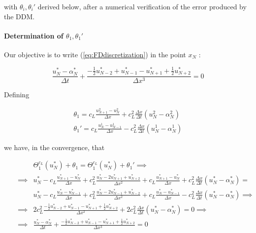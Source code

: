 \noindent with $\theta_i, \theta_i'$ derived below, after a numerical verification of the error produced by the DDM.


\paragraph{Determination of $\theta_1, \theta_1'$}

\indent Our objective is to write (\ref{eq:FDdiscretization}) in the point $x_{N}$ :

\begin{equation}
    \label{eq:FDdiscretizationN}
    \frac{u_{N}^* - \alpha_{N}^*}{\Delta t} + \frac{-\frac{1}{2}u_{N-2}^* + u_{N-1}^* - u_{N+1}^* + \frac{1}{2}u_{N+2}^* }{\Delta x ^3} = 0
\end{equation}

\indent Defining 

\begin{gather}
    \theta_1 = c_L \frac{u_{N+1}^2 - u_{N}^2}{\Delta x} + c_L^2\frac{\Delta x}{\Delta t} \left( u_{N}^2 - \alpha_{N}^2 \right)\\
    \theta_1' = c_L \frac{u_{N}^1 - u_{N-1}^1}{\Delta x} - c_L^2\frac{\Delta x}{\Delta t} \left( u_{N}^1 - \alpha_{N}^1 \right)
\end{gather}

\indent we have, in the convergence, that

\begin{equation}
\label{eq:modifiedTBC1}
\begin{aligned}
&& &    \Theta_1^{c_L}(u_N^*) + \theta_1 = \Theta_1^{c_L}(u_N^*) + \theta_1'\implies \\
&& \implies &    u_N^* - c_L \frac{u_{N+1}^* - u_N^*}{\Delta x} + c_L^2\frac{u_N^* - 2u_{N+1}^* + u_{N+2}^*}{\Delta x^2} + c_L \frac{u_{N+1}^* - u_{N}^*}{\Delta x} + c_L^2\frac{\Delta x}{\Delta t} \left( u_{N}^* - \alpha_{N}^* \right) = \\
&& & u_N^* - c_L \frac{u_{N}^* - u_{N-1}^*}{\Delta x} + c_L^2\frac{u_N^* - 2u_{N-1}^* + u_{N-2}^*}{\Delta x^2} + c_L \frac{u_{N}^* - u_{N-1}^*}{\Delta x} - c_L^2\frac{\Delta x}{\Delta t} \left( u_{N}^* - \alpha_{N}^* \right) \implies \\
 && \implies &    2c_L^2 \frac{-\frac{1}{2}u_{N-2}^* + u_{N-1}^* - u_{N+1}^* + \frac{1}{2}u_{N+2}^* }{\Delta x ^2}  +             2c_L^2\frac{\Delta x}{\Delta t} \left( u_{N}^* - \alpha_{N}^* \right) = 0 \implies \\
&& \implies &    \frac{u_{N}^* - \alpha_{N}^*}{\Delta t} + \frac{-\frac{1}{2}u_{N-2}^* + u_{N-1}^* - u_{N+1}^* + \frac{1}{2}u_{N+2}^* }{\Delta x ^3} = 0
\end{aligned}
\end{equation}

